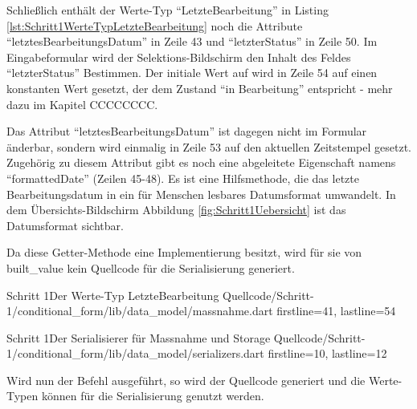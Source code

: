 Schließlich enthält der Werte-Typ \enquote{LetzteBearbeitung} in Listing \ref{lst:Schritt1WerteTypLetzteBearbeitung} noch die Attribute \enquote{letztesBearbeitungsDatum} in Zeile 43 und \enquote{letzterStatus} in Zeile 50. Im Eingabeformular wird der Selektions-Bildschirm den Inhalt des Feldes \enquote{letzterStatus} Bestimmen. Der initiale Wert auf wird in Zeile 54 auf einen konstanten Wert gesetzt, der dem Zustand \enquote{in Bearbeitung} entspricht - mehr dazu im Kapitel CCCCCCCC.

Das Attribut \enquote{letztesBearbeitungsDatum} ist dagegen nicht im Formular änderbar, sondern wird einmalig in Zeile 53 auf den aktuellen Zeitstempel gesetzt. Zugehörig zu diesem Attribut gibt es noch eine abgeleitete Eigenschaft namens \enquote{formattedDate} (Zeilen 45-48).  Es ist eine Hilfsmethode, die das letzte Bearbeitungsdatum in ein für Menschen lesbares Datumsformat umwandelt. In dem Übersichts-Bildschirm Abbildung \ref{fig:Schritt1Uebersicht} ist das Datumsformat sichtbar.

Da diese Getter-Methode eine Implementierung besitzt, wird für sie von built_value kein Quellcode für die Serialisierung generiert.



\begin{alexlisting}{Schritt 1}{Der Werte-Typ LetzteBearbeitung}
  {Quellcode/Schritt-1/conditional_form/lib/data_model/massnahme.dart}
  {firstline=41, lastline=54}
  \label{lst:Schritt1WerteTypLetzteBearbeitung}
\end{alexlisting}


\begin{alexlisting}{Schritt 1}{Der Serialisierer für Massnahme und Storage}
  {Quellcode/Schritt-1/conditional_form/lib/data_model/serializers.dart}
  {firstline=10, lastline=12}
  \label{lst:Schritt1Serialisierer}
\end{alexlisting}



Wird nun der Befehl   ausgeführt, so wird der Quellcode generiert und die Werte-Typen können für die Serialisierung genutzt werden.

